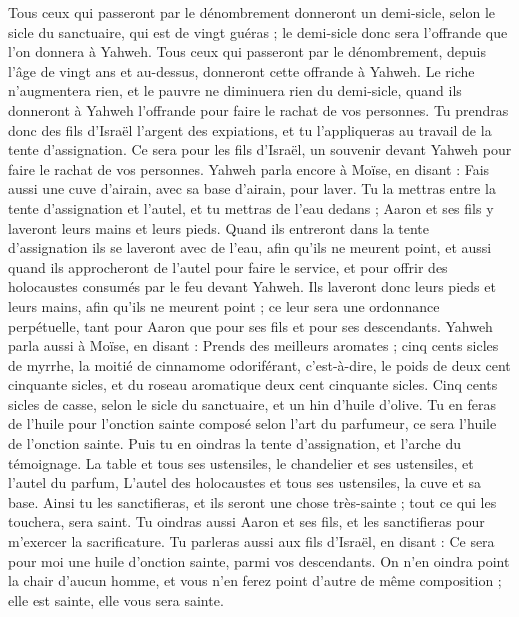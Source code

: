 \begin{multicols}{2}
Tous ceux qui passeront par le dénombrement donneront un demi-sicle, selon le sicle du sanctuaire, qui est de vingt guéras ; le demi-sicle donc sera l'offrande que l'on donnera à Yahweh.
Tous ceux qui passeront par le dénombrement, depuis l'âge de vingt ans et au-dessus, donneront cette offrande à Yahweh.
Le riche n'augmentera rien, et le pauvre ne diminuera rien du demi-sicle, quand ils donneront à Yahweh l'offrande pour faire le rachat de vos personnes.
Tu prendras donc des fils d'Israël l'argent des expiations, et tu l'appliqueras au travail de la tente d'assignation. Ce sera pour les fils d'Israël, un souvenir devant Yahweh pour faire le rachat de vos personnes.
Yahweh parla encore à Moïse, en disant :
Fais aussi une cuve d'airain, avec sa base d'airain, pour laver. Tu la mettras entre la tente d'assignation et l'autel, et tu mettras de l'eau dedans ;
Aaron et ses fils y laveront leurs mains et leurs pieds.
Quand ils entreront dans la tente d'assignation ils se laveront avec de l'eau, afin qu'ils ne meurent point, et aussi quand ils approcheront de l'autel pour faire le service, et pour offrir des holocaustes consumés par le feu devant Yahweh.
Ils laveront donc leurs pieds et leurs mains, afin qu'ils ne meurent point ; ce leur sera une ordonnance perpétuelle, tant pour Aaron que pour ses fils et pour ses descendants.
Yahweh parla aussi à Moïse, en disant :
Prends des meilleurs aromates ; cinq cents sicles de myrrhe, la moitié de cinnamome odoriférant, c'est-à-dire, le poids de deux cent cinquante sicles, et du roseau aromatique deux cent cinquante sicles.
Cinq cents sicles de casse, selon le sicle du sanctuaire, et un hin d'huile d'olive.
Tu en feras de l'huile pour l'onction sainte composé selon l’art du parfumeur, ce sera l'huile de l'onction sainte.
Puis tu en oindras la tente d'assignation, et l'arche du témoignage.
La table et tous ses ustensiles, le chandelier et ses ustensiles, et l'autel du parfum,
L'autel des holocaustes et tous ses ustensiles, la cuve et sa base.
Ainsi tu les sanctifieras, et ils seront une chose très-sainte ; tout ce qui les touchera, sera saint.
Tu oindras aussi Aaron et ses fils, et les sanctifieras pour m'exercer la sacrificature.
Tu parleras aussi aux fils d'Israël, en disant : Ce sera pour moi une huile d’onction sainte, parmi vos descendants.
On n'en oindra point la chair d'aucun homme, et vous n'en ferez point d'autre de même composition ; elle est sainte, elle vous sera sainte.

\end{multicols}
